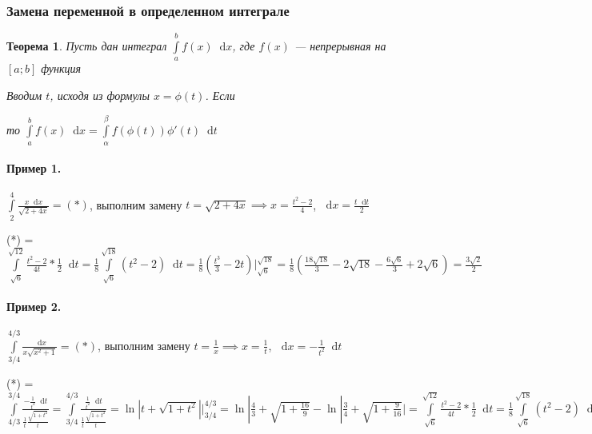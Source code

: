 \documentclass{article}
\newcommand*\diff{\mathop{}\!\mathrm{d}}
\newtheorem{theorem}{Теорема}
\begin{document}
\subsubsection{Замена переменной в определенном интеграле}

\begin{theorem}
Пусть дан интеграл $\int\limits_{a}^{b} f(x) \diff x$, где $f(x)$ — непрерывная на $[a; b]$ функция

Вводим $t$, исходя из формулы $x = \phi(t)$. Если

\begin{multienumerate}
\end{multienumerate}

то $\int\limits_{a}^{b} f(x) \diff x = \int\limits_{\alpha}^{\beta} f(\phi(t)) \phi'(t) \diff t$
\end{theorem}

\paragraph{Пример 1.} $\int\limits_{2}^{4} \frac{x \diff x}{\sqrt{2 + 4x}} = (*)$, выполним замену $t = \sqrt{2 + 4x} \implies x = \frac{t^2 - 2}{4}$, $\diff x = \frac{t \diff t}{2}$

(*) = $\int\limits_{\sqrt{6}}^{\sqrt{12}} \frac{t^2 - 2}{4t} * \frac{1}{2} \diff t = \frac{1}{8} \int\limits_{\sqrt{6}}^{\sqrt{18}} (t^2 - 2) \diff t = \frac{1}{8} (\frac{t^3}{3} - 2t) \bigg|_{\sqrt{6}}^{\sqrt{18}} = \frac{1}{8} (\frac{18 \sqrt{18}}{3} - 2 \sqrt{18} - \frac{6\sqrt{6}}{3} + 2 \sqrt{6}) = \frac{3\sqrt{2}}{2}$

\paragraph{Пример 2. } $\int\limits_{3/4}^{4/3} \frac{\diff x}{x\sqrt{x^2 + 1}} = (*)$, выполним замену $t = \frac{1}{x} \implies x = \frac{1}{t}$, $\diff x = -\frac{1}{t^2} \diff t$

(*) = $
\int\limits_{4/3}^{3/4} \frac{-\frac{1}{t^2} \diff t}{\frac{1}{t} \frac{\sqrt{1 + t^2}}{t}} = \int\limits_{3/4}^{4/3} \frac{\frac{1}{t^2} \diff t}{\frac{1}{t} \frac{\sqrt{1 + t^2}}{t}} = \ln |t + \sqrt{1 + t^2}| \bigg|_{3/4}^{4/3} = \ln |\frac{4}{3} + \sqrt{1 + \frac{16}{9}} - \ln |\frac{3}{4} + \sqrt{1 + \frac{9}{16}}| = \int\limits_{\sqrt{6}}^{\sqrt{12}} \frac{t^2 - 2}{4t} * \frac{1}{2} \diff t = \frac{1}{8} \int\limits_{\sqrt{6}}^{\sqrt{18}} (t^2 - 2) \diff t = \frac{1}{8} (\frac{t^3}{3} - 2t) \bigg|_{\sqrt{6}}^{\sqrt{18}} = \ln \frac{3}{2}
$
\end{document}
